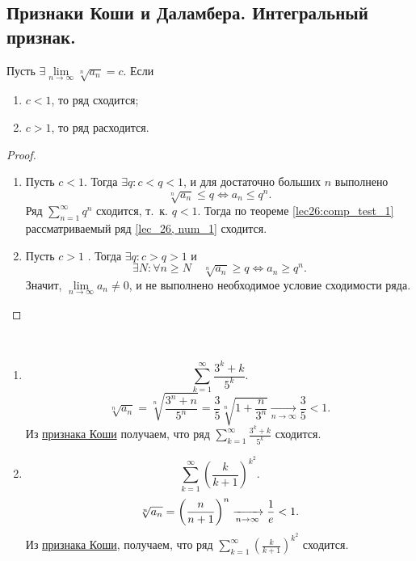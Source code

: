 \documentclass[../../main.tex]{subfiles}
\begin{document}
	\subsection{Признаки Коши и Даламбера. Интегральный признак.}
	
	\begin{thm}\label{lec27:cauchy} 	
		Пусть $\exists \lim\limits_{n \to \infty } \sqrt[n]{a_n}  = c$. Если
	\begin{enumerate}[label={\alph*)}]
			\item $c < 1$, то ряд сходится;
			\item $c > 1$, то ряд расходится.
	\end{enumerate}
	\end{thm}
	\begin{proof}
		
		~
		
	\begin{enumerate}[label={\alph*)}]
		 \item Пусть $c < 1$. Тогда $\exists q: c < q < 1$, и для достаточно больших 
		 $n$ выполнено
			\[ \sqrt[n]{a_n} \leq q \iff a_n \leq q^n. \]
			Ряд $\sum\limits_{n=1}^{\infty} q^n$ сходится, т.~к. $q < 1$. Тогда по 
			теореме \ref{lec26:comp_test_1}
			рассматриваемый ряд \eqref{lec_26, num_1} сходится.
			 
		\item Пусть $c>1$ . Тогда $\exists q : c > q > 1 $ и \[\exists N : \forall n 
		\geq N \quad
			 \sqrt[n]{a_n} \geq q \iff a_n \geq q^n.\] Значит, $\lim\limits_{n \to 
			 \infty} a_n 
			 \neq 0$, и не выполнено необходимое условие сходимости ряда. \qedhere
	\end{enumerate}
	\end{proof}

	\begin{examples}

	~

	\begin{enumerate}
	 \item
		\[ \sum_{k=1}^{\infty}  \frac{3^k + k}{5^k}.  \]
		\[ \sqrt[n]{a_n} = \sqrt[n]{\frac{3^n + n}{5^n}} = \frac{3}{5} \sqrt[n]{1 + 
		\frac{n}{3^n}}  \underset{n \rightarrow \infty}
		{\longrightarrow} \frac{3}{5} < 1.    \]
		Из \hyperref[lec27:cauchy]{признака Коши} получаем, что ряд  
		$\sum\limits_{k=1}^{\infty}  \frac{3^k + k}{5^k}$
		сходится.
	\item
		\[ \sum_{k=1}^{\infty} \left( \frac{k}{k+1}\right) ^{k^2}. \]
		\[ \sqrt[n]{a_n} =  \left( \frac{n}{n+1}\right) ^n  \xrightarrow[n \rightarrow 
		\infty]{} \frac{1}{e} < 1. \]
		Из \hyperref[lec27:cauchy]{признака Коши}, получаем, что ряд 
		$\sum\limits_{k=1}^{\infty} \left( \frac{k}{k+1}\right) ^{k^2}$ сходится.
	\end{enumerate}
	\end{examples} 	
\end{document}
